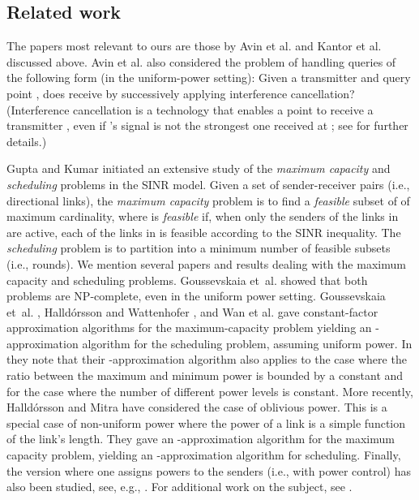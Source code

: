 \documentclass[11pt]{article}
\theoremstyle{remark}
\begin{document}
\subsection{Related work}
The papers most relevant to ours are those by Avin et al. \cite{aeklpr-sdciawn-12} and Kantor et al. \cite{klpp-twn-11} discussed above. Avin et al. \cite{SINR-Diag-SIC} also considered the problem of handling queries of the following form (in the uniform-power setting): Given a transmitter  and query point , does  receive  by successively applying interference cancellation? (Interference cancellation is a technology that enables a point  to receive a transmitter , even if 's signal is not the strongest one received at ; see \cite{SINR-Diag-SIC} for further details.) 


Gupta and Kumar \cite{GK00} initiated an extensive study of the \emph{maximum capacity} and \emph{scheduling} problems in the SINR model.
Given a set  of sender-receiver pairs (i.e., directional links), the \emph{maximum capacity} problem is to find a \emph{feasible} subset of  of maximum cardinality, where  is \emph{feasible} if, when only the senders of the links in  are active, each of the links in  is feasible according to the SINR inequality. The \emph{scheduling} problem is to partition  into a minimum number of feasible subsets (i.e., rounds).  
We mention several papers and results dealing with the maximum capacity and scheduling problems. 
Goussevskaia et~al. \cite{GOW07} showed that both problems are NP-complete, even in the uniform power setting.  
Goussevskaia et~al. \cite{GHWW09}, Halld{\'o}rsson and Wattenhofer \cite{HW09}, and Wan et al. \cite{WJY09} gave constant-factor approximation algorithms for the maximum-capacity problem yielding an -approximation algorithm for the scheduling problem, assuming uniform power. In \cite{GHWW09} they note that their -approximation algorithm also applies to the case where the ratio between the maximum and minimum power is bounded by a constant and for the case where the number of different power levels is constant.
More recently, Halld{\'o}rsson and Mitra \cite{HM11_SODA} have considered the case of oblivious power. This is a special case of non-uniform power where the power of a link is a simple function of the link's length. They gave an -approximation algorithm for the maximum capacity problem, yielding an -approximation algorithm for scheduling. 
Finally, the version where one assigns powers to the senders (i.e., with power control) has also been studied, see, e.g., \cite{AD09,MW06,K11,HM11_SODA,H12}.  For additional work on the subject, see \cite{AschnerCK14}.
\end{document}
